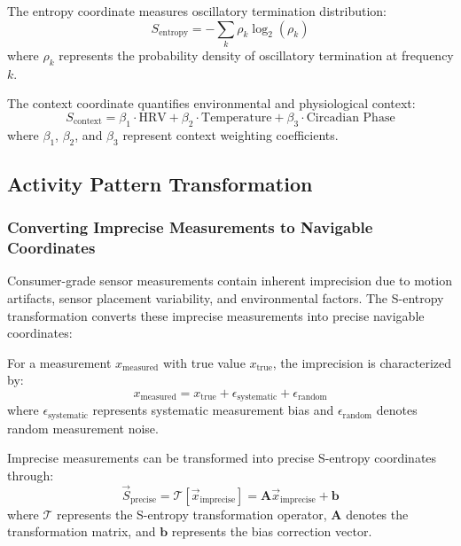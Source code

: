 \begin{definition}
The entropy coordinate measures oscillatory termination distribution:
\begin{equation}
S_{\text{entropy}} = -\sum_{k} \rho_k \log_2(\rho_k)
\end{equation}
where $\rho_k$ represents the probability density of oscillatory termination at frequency $k$.
\end{definition}

\begin{definition}
The context coordinate quantifies environmental and physiological context:
\begin{equation}
S_{\text{context}} = \beta_1 \cdot \text{HRV} + \beta_2 \cdot \text{Temperature} + \beta_3 \cdot \text{Circadian Phase}
\end{equation}
where $\beta_1$, $\beta_2$, and $\beta_3$ represent context weighting coefficients.
\end{definition}

\subsection{Activity Pattern Transformation}

\subsubsection{Converting Imprecise Measurements to Navigable Coordinates}

Consumer-grade sensor measurements contain inherent imprecision due to motion artifacts, sensor placement variability, and environmental factors. The S-entropy transformation converts these imprecise measurements into precise navigable coordinates:

\begin{definition}
For a measurement $x_{\text{measured}}$ with true value $x_{\text{true}}$, the imprecision is characterized by:
\begin{equation}
x_{\text{measured}} = x_{\text{true}} + \epsilon_{\text{systematic}} + \epsilon_{\text{random}}
\end{equation}
where $\epsilon_{\text{systematic}}$ represents systematic measurement bias and $\epsilon_{\text{random}}$ denotes random measurement noise.
\end{definition}

\begin{theorem}
Imprecise measurements can be transformed into precise S-entropy coordinates through:
\begin{equation}
\vec{S}_{\text{precise}} = \mathcal{T}[\vec{x}_{\text{imprecise}}] = \mathbf{A} \vec{x}_{\text{imprecise}} + \mathbf{b}
\end{equation}
where $\mathcal{T}$ represents the S-entropy transformation operator, $\mathbf{A}$ denotes the transformation matrix, and $\mathbf{b}$ represents the bias correction vector.
\end{theorem}

